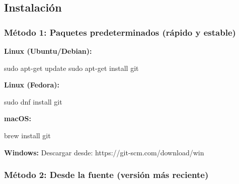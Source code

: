 \documentclass[
  doc,
  floatsintext,
  longtable,
  a4paper,
  nolmodern,
  notxfonts,
  notimes,
  12pt,
  colorlinks=true,linkcolor=blue,citecolor=blue,urlcolor=blue]{apa7}
\newenvironment{Shaded}{\begin{snugshade}}{\end{snugshade}}
\newcommand{\ExtensionTok}[1]{\textcolor[rgb]{0.00,0.23,0.31}{#1}}
\newcommand{\FunctionTok}[1]{\textcolor[rgb]{0.28,0.35,0.67}{#1}}
\newcommand{\NormalTok}[1]{\textcolor[rgb]{0.00,0.23,0.31}{#1}}
\begin{document}
\subsection{Instalación}\label{instalaciuxf3n}

\subsubsection{Método 1: Paquetes predeterminados (rápido y
estable)}\label{muxe9todo-1-paquetes-predeterminados-ruxe1pido-y-estable}

\textbf{Linux (Ubuntu/Debian):}

\begin{Shaded}
\begin{Highlighting}[]
\FunctionTok{sudo}\NormalTok{ apt{-}get update}
\FunctionTok{sudo}\NormalTok{ apt{-}get install git}
\end{Highlighting}
\end{Shaded}

\textbf{Linux (Fedora):}

\begin{Shaded}
\begin{Highlighting}[]
\FunctionTok{sudo}\NormalTok{ dnf install git}
\end{Highlighting}
\end{Shaded}

\textbf{macOS:}

\begin{Shaded}
\begin{Highlighting}[]
\ExtensionTok{brew}\NormalTok{ install git}
\end{Highlighting}
\end{Shaded}

\textbf{Windows:} Descargar desde: https://git-scm.com/download/win

\subsubsection{Método 2: Desde la fuente (versión más
reciente)}\label{muxe9todo-2-desde-la-fuente-versiuxf3n-muxe1s-reciente}
\end{document}
